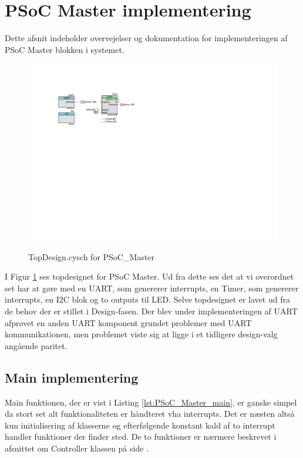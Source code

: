\section{PSoC Master implementering} \label{sec:PSoC_Master_impl}
Dette afsnit indeholder overvejelser og dokumentation for implementeringen af PSoC Master blokken i systemet.

\begin{figure}[h]
\centering
\includegraphics[width=\textwidth*3/5, trim=100 380 500 100, clip=true]{../fig/TopDesign_PSoC_Master}
\label{fig:psoc_master_topdesign}
\caption{TopDesign.cysch for PSoC\_Master}
\end{figure}
  
I Figur \ref{fig:psoc_master_topdesign} ses topdesignet for PSoC Master. Ud fra dette ses det at vi overordnet set har at gøre med en UART, som genererer interrupts, en Timer, som genererer interrupts, en I2C blok og to outputs til LED. 
Selve topdesignet er lavet ud fra de behov der er stillet i Design-fasen. Der blev under implementeringen af UART afprøvet en anden UART komponent grundet problemer med UART kommunikationen, men problemet viste sig at ligge i et tidligere design-valg angående paritet.

\subsection{Main implementering}
Main funktionen, der er vist i Listing \ref{lst:PSoC_Master_main}, er ganske simpel da stort set alt funktionaliteten er håndteret vha interrupts. 
Det er næsten altså kun initialisering af klasserne og efterfølgende konstant kald af to interrupt handler funktioner der finder sted. 
De to funktioner er nærmere beskrevet i afsnittet om Controller klassen på side \pageref{sec:Controller_impl}.

